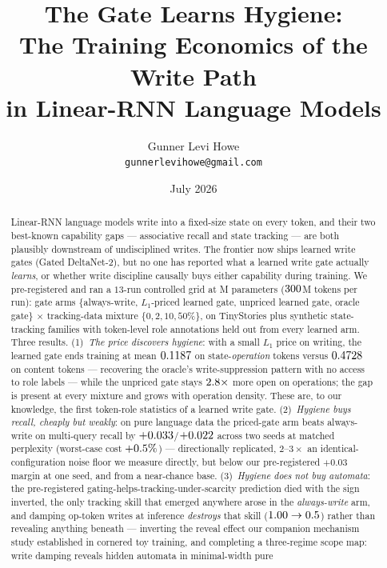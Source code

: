 \documentclass[10pt]{article}
\title{The Gate Learns Hygiene:\\ The Training Economics of the Write Path\\ in Linear-RNN Language Models}
\author{Gunner Levi Howe\\\texttt{gunnerlevihowe@gmail.com}}
\date{July 2026}
\begin{document}
\maketitle

\begin{abstract}
Linear-RNN language models write into a fixed-size state on every token, and their two best-known
capability gaps --- associative recall and state tracking --- are both plausibly downstream of
undisciplined writes. The frontier now ships learned write gates (Gated DeltaNet-2), but no one has
reported what a learned write gate actually \emph{learns}, or whether write discipline causally buys
either capability during training. We pre-registered and ran a $13$-run controlled grid at
\tgParamsM{}M parameters ($300$M tokens per run): gate arms
$\{$always-write, $L_1$-priced learned gate, unpriced learned gate, oracle gate$\}$
$\times$ tracking-data mixture $\{0,2,10,50\%\}$, on TinyStories plus synthetic state-tracking
families with token-level role annotations held out from every learned arm. Three results.
(1)~\emph{The price discovers hygiene}: with a small $L_1$ price on writing, the learned gate ends
training at mean $0.1187$ on state-\emph{operation} tokens versus $0.4728$ on
content tokens --- recovering the oracle's write-suppression pattern with no access to role labels ---
while the unpriced gate stays $2.8\times$ more open on operations; the gap is
present at every mixture and grows with operation density. These are, to our knowledge, the first
token-role statistics of a learned write gate. (2)~\emph{Hygiene buys recall, cheaply but weakly}:
on pure language data the priced-gate arm beats always-write on multi-query recall by
$+0.033$/$+0.022$ across two seeds at matched perplexity (worst-case cost
$+0.5\%$) --- directionally replicated, $2$--$3\times$ an identical-configuration
noise floor we measure directly, but below our pre-registered $+0.03$ margin at one seed, and from a
near-chance base. (3)~\emph{Hygiene does not buy automata}: the pre-registered
gating-helps-tracking-under-scarcity prediction died with the sign inverted, the only tracking skill
that emerged anywhere arose in the \emph{always-write} arm, and damping op-token writes at inference
\emph{destroys} that skill ($1.00\to0.5$) rather than revealing anything beneath
--- inverting the reveal effect our companion mechanism study established in cornered toy training,
and completing a three-regime scope map: write damping reveals hidden automata in minimal-width pure

\end{abstract}
\end{document}
